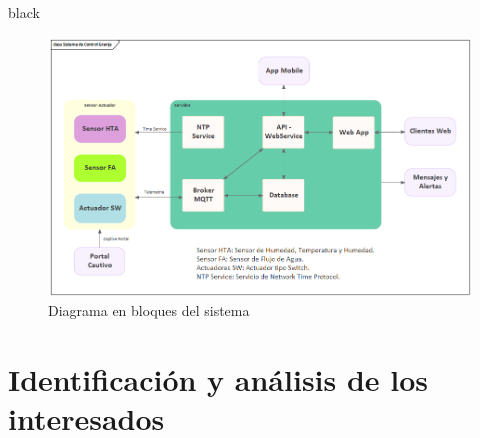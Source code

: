 \documentclass[11pt]{charter}
\begin{document}
\begin{consigna}{black}

\vspace{25px}

\begin{figure}[htpb]
\centering 
\includegraphics[width=.7\textwidth]{./Figuras/diagBloques.png}
\caption{Diagrama en bloques del sistema}
\label{fig:diagBloques}
\end{figure}

\vspace{25px}
\end{consigna}


\section{Identificación y análisis de los interesados}
\label{sec:interesados}
\end{document}

